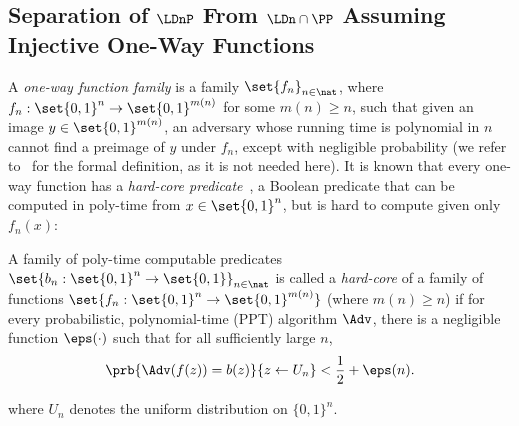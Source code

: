 \subsection{Separation of $\LDnP$ From $\LDn \cap \PP$ Assuming Injective One-Way Functions}\label{sec:owf}

A \emph{one-way function family} is a family $\set{ f_n }_{n \in \nat}$,
where $f_n : \set{0,1}^n \rightarrow \set{0,1}^{m(n)}$ for some $m(n) \geq n$,
such that given an image $y \in \set{0,1}^{m(n)}$,
an adversary whose running time is polynomial in $n$ cannot find a preimage of $y$
under $f_n$, except with negligible probability (we refer to~\cite{OdedBook} for the formal definition,
as it is not needed here).
It is known that every one-way function has a \emph{hard-core predicate}~\cite{GL89},
a Boolean predicate that can be computed in poly-time from $x \in \set{0,1}^n$,
but is hard to compute given only $f_n(x)$:
\begin{definition}\label{def:HCP}
	A family of poly-time computable predicates $ \set{ b_n : \set{0,1}^n \rightarrow \set{0,1}}_{n \in \nat}$ is called a \emph{hard-core} of a
	family of functions $\set{ f_n : \set{0,1}^n \rightarrow \set{0,1}^{m(n)}}$ (where $m(n) \geq n$)
	if for every probabilistic, polynomial-time (PPT) algorithm $\Adv$, there is a negligible function $\eps(\cdot)$ such that
	for all sufficiently large $n$,
	\begin{equation*}
		\prb{
			\Adv( f(z) ) = b(z)
		}
		{
			z \leftarrow U_n
		}
		<
		\frac{1}{2} + \eps(n).
	\end{equation*}
\end{definition}
where $U_n$ denotes the uniform distribution on $\{0,1\}^n$.

